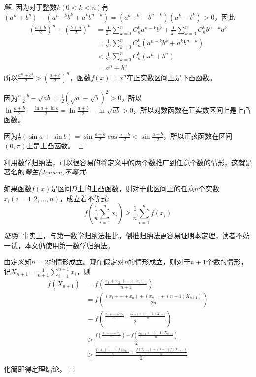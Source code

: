 \begin{proof}[解]
因为对于整数$k(0 < k < n)$有$(a^n+b^n)-(a^{n-k}b^k+a^kb^{n-k})=(a^{n-k}-b^{n-k})(a^k-b^k)>0$，因此
\begin{equation}
  \begin{split}
\left( \frac{a+b}{2} \right)^n + \left( \frac{b+a}{2} \right)^n & = \frac{1}{2^n} \sum_{k=0}^nC_n^ka^{n-k}b^k + \frac{1}{2^n}\sum_{k=0}^nC_n^kb^{n-k}a^k \\
& = \frac{1}{2^n} \sum_{k=0}^n C_n^k \left( a^{n-k}b^k+a^kb^{n-k} \right) \\
& < \frac{1}{2^n} \sum_{k=0}^n C_n^k \left( a^n+b^n \right) \\
& = a^n+b^n
\end{split}
\end{equation}
所以$\frac{a^n+b^n}{2}>\left( \frac{a+b}{2} \right)^n$，函数$f(x)=x^n$在正实数区间上是下凸函数。

因为$\frac{a+b}{2}-\sqrt{ab}=\frac{1}{2}(\sqrt{a}-\sqrt{b})^2>0$，所以 $\ln{\frac{a+b}{2}}-\frac{\ln{a}+\ln{b}}{2}=\ln{\frac{a+b}{2}}-\ln{\sqrt{ab}}>0$，所以对数函数在正实数区间上是上凸函数。

因为$\frac{1}{2}(\sin{a}+\sin{b})=\sin{\frac{a+b}{2}}\cos{\frac{a-b}{2}} < \sin{\frac{a+b}{2}}$，所以正弦函数在区间$(0,\pi)$上是上凸函数。
\end{proof}

利用数学归纳法，可以很容易的将定义中的两个数推广到任意个数的情形，这就是著名的\emph{琴生(Jensen)不等式}:
\begin{theorem}
  \label{theorem:convexity-function-multile}
如果函数$f(x)$是区间$D$上的上凸函数，则对于此区间上的任意$n$个实数$x_i(i=1,2,\ldots,n)$，成立着不等式:
\begin{equation}
  \label{eq:convexity-function-multile}
  f(\frac{1}{n}\sum_{i=1}^nx_i) \geqslant \frac{1}{n}\sum_{i=1}^nf(x_i)
\end{equation}
\end{theorem}

\begin{proof}[证明]
  事实上，与第一数学归纳法相比，倒推归纳法更容易证明本定理，读者不妨一试，本文仍使用第一数学归纳法。

  由定义知$n=2$的情形成立。现在假定对$n$的情形成立，则对于$n+1$个数的情形，记$X_{n+1}=\frac{1}{n+1}\sum_{i=1}^{n+1}x_i$，则
\begin{equation}
  \begin{split}
f(X_{n+1}) & = f \left( \frac{x_1+x_2+\cdots+x_{n+1}}{n+1} \right) \\
& = f \left( \frac{(x_1+\cdots+x_n)+(x_{n+1}+(n-1)X_{n+1})}{2n} \right) \\
& = f \left( \frac{\frac{x_1+\cdots+x_n}{n} + \frac{x_{n+1}+(n-1)X_{n+1}}{n}}{2} \right) \\
& \geqslant \frac{f \left( \frac{x_1+\cdots+x_n}{n} \right) + f \left( \frac{x_{n+1}+(n-1)X_{n+1}}{n} \right)}{2} \\
& \geqslant \frac{\frac{f(x_1)+\cdots+f(x_n)}{n} + \frac{f(x_{n+1})+(n-1)f(X_{n+1})}{n}}{2} \\
  \end{split}
\end{equation}
化简即得定理结论。
\end{proof}

